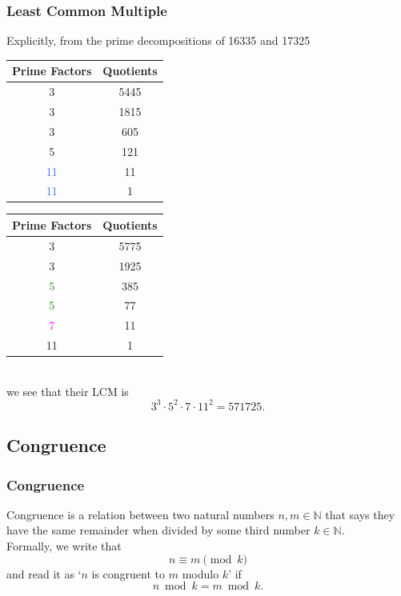 \documentclass[aspectratio=169,11pt,usenames,dvipsnames]{beamer}
\newcommand{\clr}{\textcolor{BrickRed}}
\newcommand{\clb}{\textcolor{RoyalBlue}}
\newcommand{\clg}{\textcolor{ForestGreen}}
\newcommand{\clm}{\textcolor{Magenta}}
\newcommand{\N}{\mathbb{N}}
\begin{document}
\begin{frame}
 \frametitle{Least Common Multiple}
 Explicitly, from the prime decompositions of 16335 and 17325\\
 \vspace{1em}
 \begin{minipage}{.48\textwidth}
  \centering
   \begin{tabular}{c|c}
    \textbf{Prime Factors} & \textbf{Quotients}\\
    \toprule
    \clr{3} & 5445\\
    \clr{3} & 1815\\
    \clr{3} & 605\\
    5 & 121\\
    \clb{11} & 11\\
    \clb{11} & 1
  \end{tabular}
 \end{minipage}
 \begin{minipage}{.48\textwidth}
   \begin{tabular}{c|c}
    \textbf{Prime Factors} & \textbf{Quotients}\\
    \toprule
    3 & 5775\\
    3 & 1925\\
    \clg{5} & 385\\
    \clg{5} & 77\\
    \clm{7} & 11\\
    11 & 1
  \end{tabular}
 \end{minipage}\\
 \pause
 \vspace{1em}
 we see that their LCM is
 \[
  3^3 \cdot 5^2 \cdot 7 \cdot 11^2 = 571725.
 \]
\end{frame}

\subsection{Congruence}

\begin{frame}
 \subsectionpage
\end{frame}

\begin{frame}
 \frametitle{Congruence}
 \begin{tcolorbox}[title=Congruence]
  \alert{Congruence} is a relation between two natural numbers $n,m \in \N$ that
  says they have the same remainder when divided by some third number $k \in
  \N$.\\
  \pause
  Formally, we write that
  \[
   n \equiv m \pmod{k}
  \]
  and read it as `$n$ is congruent to $m$ modulo $k$' if
  \[
   n \bmod k = m \bmod k.
  \]
 \end{tcolorbox}
\end{frame}
\end{document}
